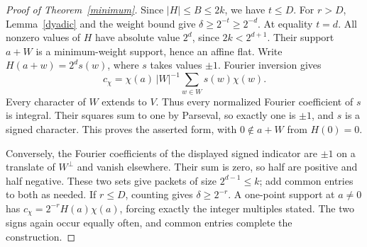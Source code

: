 \documentclass[11pt,letterpaper]{article}
\begin{document}
\begin{proof}[Proof of Theorem~\ref{minimum}]
Since \(|H|\le B\le2k\), we have \(t\le D\). For \(r>D\), Lemma~\ref{dyadic} and the weight bound give \(\delta\ge2^{-t}\ge2^{-d}\). At equality \(t=d\). All nonzero values of \(H\) have absolute value \(2^d\), since \(2k<2^{d+1}\). Their support \(a+W\) is a minimum-weight support, hence an affine flat. Write \(H(a+w)=2^ds(w)\), where \(s\) takes values \(\pm1\). Fourier inversion gives
\[
 c_\chi=\chi(a)\,|W|^{-1}\sum_{w\in W}s(w)\chi(w).
\]
Every character of \(W\) extends to \(V\). Thus every normalized Fourier coefficient of \(s\) is integral. Their squares sum to one by Parseval, so exactly one is \(\pm1\), and \(s\) is a signed character. This proves the asserted form, with \(0\notin a+W\) from \(H(0)=0\).

Conversely, the Fourier coefficients of the displayed signed indicator are \(\pm1\) on a translate of \(W^\perp\) and vanish elsewhere. Their sum is zero, so half are positive and half negative. These two sets give packets of size \(2^{d-1}\le k\); add common entries to both as needed. If \(r\le D\), counting gives \(\delta\ge2^{-r}\). A one-point support at \(a\ne0\) has \(c_\chi=2^{-r}H(a)\chi(a)\), forcing exactly the integer multiples stated. The two signs again occur equally often, and common entries complete the construction.
\end{proof}

\newpage
\end{document}
